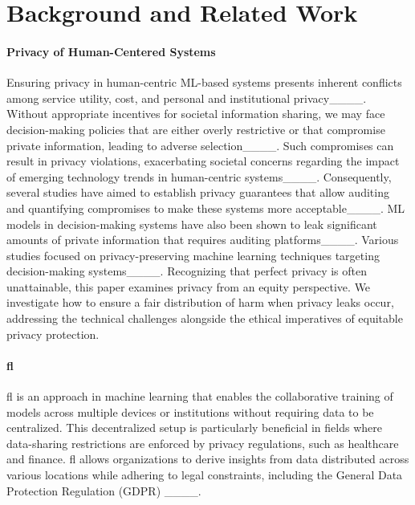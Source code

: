 \section{Background and Related Work}
\label{sec:related}

\paragraph{\textbf{Privacy of Human-Centered Systems}}
Ensuring privacy in human-centric ML-based systems presents inherent conflicts among service utility, cost, and personal and institutional privacy____. Without appropriate incentives for societal information sharing, we may face decision-making policies that are either overly restrictive or that compromise private information, leading to adverse selection____. Such compromises can result in privacy violations, exacerbating societal concerns regarding the impact of emerging technology trends in human-centric systems____. Consequently, several studies have aimed to establish privacy guarantees that allow auditing and quantifying compromises to make these systems more acceptable____. ML models in decision-making systems have also been shown to leak significant amounts of private information that requires auditing platforms____. Various studies focused on privacy-preserving machine learning techniques targeting decision-making systems____. Recognizing that perfect privacy is often unattainable, this paper examines privacy from an equity perspective. We investigate how to ensure a fair distribution of harm when privacy leaks occur, addressing the technical challenges alongside the ethical imperatives of equitable privacy protection.


\paragraph{\textbf{\acf{fl}}}
\ac{fl} is an approach in machine learning that enables the collaborative training of models across multiple devices or institutions without requiring data to be centralized. This decentralized setup is particularly beneficial in fields where data-sharing restrictions are enforced by privacy regulations, such as healthcare and finance. \ac{fl} allows organizations to derive insights from data distributed across various locations while adhering to legal constraints, including the General Data Protection Regulation (GDPR) ____.

